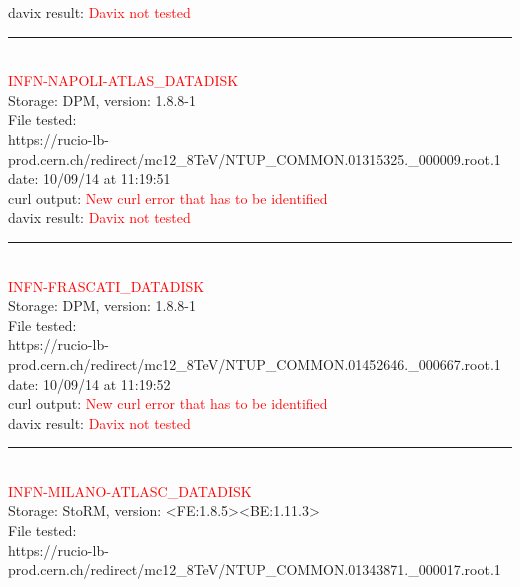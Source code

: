 davix result:  \textcolor{red}{Davix not tested}\\

\rule{\textwidth}{1pt}\\

\textcolor{red}{\normalsize{INFN-NAPOLI-ATLAS\_DATADISK}}\\

Storage: DPM, version: 1.8.8-1\\

File tested:\\
\footnotesize{https://rucio-lb-prod.cern.ch/redirect/mc12\_8TeV/NTUP\_COMMON.01315325.\_000009.root.1}\\

date: 10/09/14 at 11:19:51\\

curl output:  \textcolor{red}{New curl error that has to be identified}\\

davix result:  \textcolor{red}{Davix not tested}\\

\rule{\textwidth}{1pt}\\

\textcolor{red}{\normalsize{INFN-FRASCATI\_DATADISK}}\\

Storage: DPM, version: 1.8.8-1\\

File tested:\\
\footnotesize{https://rucio-lb-prod.cern.ch/redirect/mc12\_8TeV/NTUP\_COMMON.01452646.\_000667.root.1}\\

date: 10/09/14 at 11:19:52\\

curl output:  \textcolor{red}{New curl error that has to be identified}\\

davix result:  \textcolor{red}{Davix not tested}\\

\rule{\textwidth}{1pt}\\

\textcolor{red}{\normalsize{INFN-MILANO-ATLASC\_DATADISK}}\\

Storage: StoRM, version: <FE:1.8.5><BE:1.11.3>\\

File tested:\\
\footnotesize{https://rucio-lb-prod.cern.ch/redirect/mc12\_8TeV/NTUP\_COMMON.01343871.\_000017.root.1}\\

